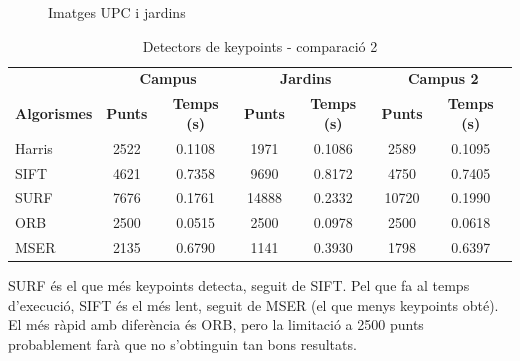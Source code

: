\begin{figure}[!htb]
				\label{fig:awesome_image3}
			\endminipage
			\caption{Imatges UPC i jardins}
		\end{figure}

		\begin{table}[H]
			\begin{center}
				\begin{tabular}{l | c c | c c | c c}
					& \multicolumn{2}{c|}{\textbf{Campus}} & \multicolumn{2}{c|}{\textbf{Jardins}} & \multicolumn{2}{c}{\textbf{Campus 2}} \\
					\textbf{Algorismes} & \textbf{Punts} & \textbf{Temps (s)} & \textbf{Punts} & \textbf{Temps (s)} & \textbf{Punts} & \textbf{Temps (s)} \\ \hline
					Harris & 2522 & 0.1108 & 1971 & 0.1086 & 2589 & 0.1095 \\
					SIFT & 4621 & 0.7358 & 9690 & 0.8172 & 4750 & 0.7405 \\
					SURF & 7676 & 0.1761 & 14888 & 0.2332 & 10720 & 0.1990 \\
					ORB & 2500 & 0.0515 & 2500 & 0.0978 & 2500 & 0.0618 \\
					MSER & 2135 & 0.6790 & 1141 & 0.3930 & 1798 & 0.6397 \\
				\end{tabular}
			\end{center}
			\caption{Detectors de keypoints - comparació 2}
		\end{table}
		\noindent
		SURF és el que més keypoints detecta, seguit de SIFT. Pel que fa al temps d'execució, SIFT és el més lent, seguit de MSER (el que menys keypoints obté). El més ràpid amb diferència és ORB, pero la
		limitació a 2500 punts probablement farà que no s'obtinguin tan bons resultats.

\newpage
